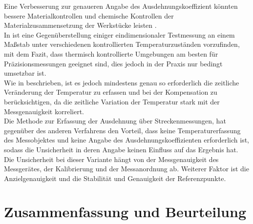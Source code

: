 Eine Verbesserung zur genaueren Angabe des Ausdehnungskoeffizient könnten bessere Materialkontrollen und chemische Kontrollen der Materialzusammensetzung der Werkstücke leisten \cite{Bryan1965}.\\
In \cite{Doiron2006} ist eine Gegenüberstellung einiger eindimensionaler Testmessung an einem Maßstab unter verschiedenen kontrollierten Temperaturzuständen vorzufinden, mit dem Fazit, dass thermisch kontrollierte Umgebungen am besten für Präzisionsmessungen geeignet sind, dies jedoch in der Praxis nur bedingt umsetzbar ist.\\
Wie in \cite{Bryan1965} beschrieben, ist es jedoch mindestens genau so erforderlich die zeitliche Veränderung der Temperatur zu erfassen und bei der Kompensation zu berücksichtigen, da die zeitliche Variation der Temperatur stark mit der Messgenauigkeit korreliert.\\
Die Methode zur Erfassung der Ausdehnung über Streckenmessungen, hat gegenüber des anderen Verfahrens den Vorteil, dass keine Temperaturerfassung des Messobjektes und keine Angabe des Ausdehnungskoeffizienten erforderlich ist, sodass die Unsicherheit in deren Angabe keinen Einfluss auf das Ergebnis hat. Die Unsicherheit bei dieser Variante hängt von der Messgenauigkeit des Messgerätes, der Kalibrierung und der Messanordnung ab. Weiterer Faktor ist die Anzielgenauigkeit und die Stabilität und Genauigkeit der Referenzpunkte.

\section{Zusammenfassung und Beurteilung}\label{sec:beurteilung}

